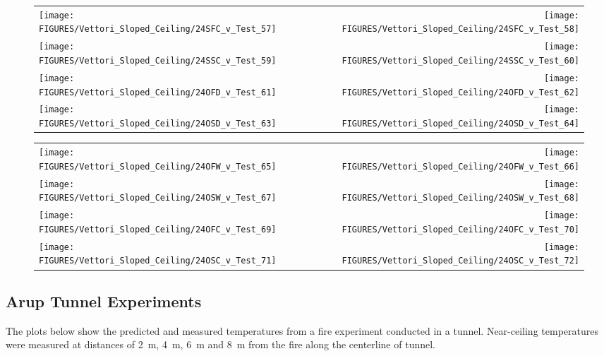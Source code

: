 \begin{figure}[p]
\begin{tabular*}{\textwidth}{l@{\extracolsep{\fill}}r}
\texttt{[image: FIGURES/Vettori\_Sloped\_Ceiling/24SFC\_v\_Test\_57]} &
\texttt{[image: FIGURES/Vettori\_Sloped\_Ceiling/24SFC\_v\_Test\_58]} \\
\texttt{[image: FIGURES/Vettori\_Sloped\_Ceiling/24SSC\_v\_Test\_59]} &
\texttt{[image: FIGURES/Vettori\_Sloped\_Ceiling/24SSC\_v\_Test\_60]} \\
\texttt{[image: FIGURES/Vettori\_Sloped\_Ceiling/24OFD\_v\_Test\_61]} &
\texttt{[image: FIGURES/Vettori\_Sloped\_Ceiling/24OFD\_v\_Test\_62]} \\
\texttt{[image: FIGURES/Vettori\_Sloped\_Ceiling/24OSD\_v\_Test\_63]} &
\texttt{[image: FIGURES/Vettori\_Sloped\_Ceiling/24OSD\_v\_Test\_64]} \\
\end{tabular*}
\label{Vettori_Sloped_8}
\end{figure}

\begin{figure}[p]
\begin{tabular*}{\textwidth}{l@{\extracolsep{\fill}}r}
\texttt{[image: FIGURES/Vettori\_Sloped\_Ceiling/24OFW\_v\_Test\_65]} &
\texttt{[image: FIGURES/Vettori\_Sloped\_Ceiling/24OFW\_v\_Test\_66]} \\
\texttt{[image: FIGURES/Vettori\_Sloped\_Ceiling/24OSW\_v\_Test\_67]} &
\texttt{[image: FIGURES/Vettori\_Sloped\_Ceiling/24OSW\_v\_Test\_68]} \\
\texttt{[image: FIGURES/Vettori\_Sloped\_Ceiling/24OFC\_v\_Test\_69]} &
\texttt{[image: FIGURES/Vettori\_Sloped\_Ceiling/24OFC\_v\_Test\_70]} \\
\texttt{[image: FIGURES/Vettori\_Sloped\_Ceiling/24OSC\_v\_Test\_71]} &
\texttt{[image: FIGURES/Vettori\_Sloped\_Ceiling/24OSC\_v\_Test\_72]} \\
\end{tabular*}
\label{Vettori_Sloped_9}
\end{figure}

\clearpage

\subsection{Arup Tunnel Experiments}

The plots below show the predicted and measured temperatures from a fire experiment conducted in a tunnel. Near-ceiling temperatures
were measured at distances of 2~m, 4~m, 6~m and 8~m from the fire along the centerline of tunnel.



